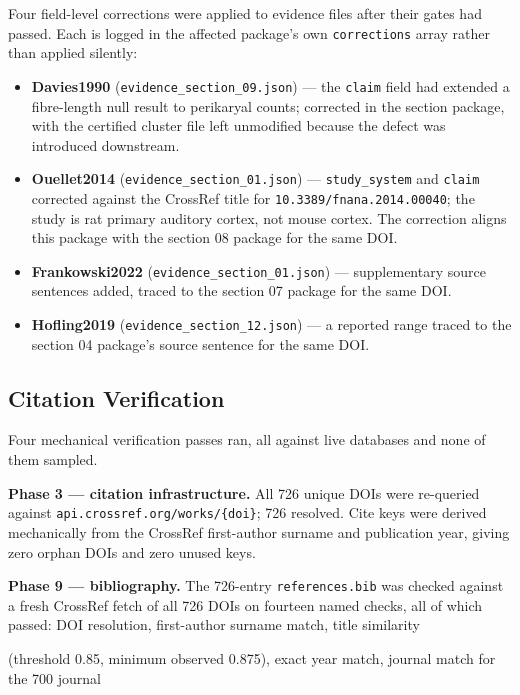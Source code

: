 \documentclass[11pt]{article}
\begin{document}
Four field-level corrections were applied to evidence files after their gates had passed. Each is logged in the affected package's own \texttt{corrections} array rather than applied silently:

\begin{itemize}
\item \textbf{Davies1990} (\texttt{evidence\_section\_09.json}) --- the \texttt{claim} field had extended a fibre-length null result to perikaryal counts; corrected in the section package, with the certified cluster file left unmodified because the defect was introduced downstream.
\item \textbf{Ouellet2014} (\texttt{evidence\_section\_01.json}) --- \texttt{study\_system} and \texttt{claim} corrected against the CrossRef title for \texttt{10.3389/fnana.2014.00040}; the study is rat primary auditory cortex, not mouse cortex. The correction aligns this package with the section 08 package for the same DOI.
\item \textbf{Frankowski2022} (\texttt{evidence\_section\_01.json}) --- supplementary source sentences added, traced to the section 07 package for the same DOI.
\item \textbf{Hofling2019} (\texttt{evidence\_section\_12.json}) --- a reported range traced to the section 04 package's source sentence for the same DOI.
\end{itemize}

\subsection{Citation Verification}
\label{sec-methods-citation-verification}

Four mechanical verification passes ran, all against live databases and none of them sampled.

\textbf{Phase 3 --- citation infrastructure.} All 726 unique DOIs were re-queried against \texttt{api.crossref.org/works/\{doi\}}; 726 resolved. Cite keys were derived mechanically from the CrossRef first-author surname and publication year, giving zero orphan DOIs and zero unused keys.

\textbf{Phase 9 --- bibliography.} The 726-entry \texttt{references.bib} was checked against a fresh CrossRef fetch of all 726 DOIs on fourteen named checks, all of which passed: DOI resolution, first-author surname match, title similarity

(threshold 0.85, minimum observed 0.875), exact year match, journal match for the 700 journal
\end{document}
